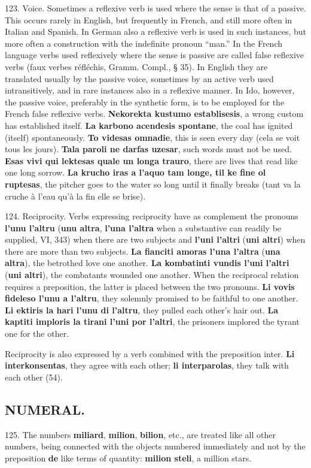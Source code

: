123. Voice. Sometimes a reflexive verb is used where the sense is that of a passive. This occurs rarely in English, but frequently in French, and still more often in Italian and Spanish. In German also a reflexive verb is used in such instances, but more often a construction with the indefinite pronoun ``man.'' In the French language verbs used reflexively where the sense is passive are called false reflexive verbs (faux verbes réfléchis, Gramm. Compl., § 35). In English they are translated usually by the passive voice, sometimes by an active verb used intransitively, and in rare instances also in a reflexive manner. In Ido, however, the passive voice, preferably in the synthetic form, is to be employed for the French false reflexive verbs. \textbf{Nekorekta kustumo establisesis}, a wrong custom has established itself. \textbf{La karbono acendesis spontane}, the coal has ignited (itself) spontaneously. \textbf{To videsas omnadie}, this is seen every day (cela se voit tous les jours). \textbf{Tala paroli ne darfas uzesar}, such words must not be used. \textbf{Esas vivi qui lektesas quale un longa trauro}, there are lives that read like one long sorrow. \textbf{La krucho iras a l'aquo tam longe, til ke fine ol ruptesas}, the pitcher goes to the water so long until it finally breaks (tant va la cruche à l'eau qu'à la fin elle se brise).

124. Reciprocity. Verbs expressing reciprocity have as complement the pronouns \textbf{l'unu l'altru} (\textbf{unu altra}, \textbf{l'una l'altra} when a substantive can readily be supplied, VI, 343) when there are two subjects and \textbf{l'uni l'altri} (\textbf{uni altri}) when there are more than two subjects. \textbf{La fianciti amoras l'una l'altra }(\textbf{una altra}), the betrothed love one another. \textbf{La kombatinti vundis l'uni l'altri }(\textbf{uni altri}), the combatants wounded one another. When the reciprocal relation requires a preposition, the latter is placed between the two pronouns. \textbf{Li vovis fideleso l'unu a l'altru}, they solemnly promised to be faithful to one another. \textbf{Li ektiris la hari l'unu di l'altru}, they pulled each other's hair out. \textbf{La kaptiti imploris la tirani l'uni por l'altri}, the prisoners implored the tyrant one for the other.

Reciprocity is also expressed by a verb combined with the preposition inter. \textbf{Li interkonsentas}, they agree with each other; \textbf{li interparolas}, they talk with each other (54).

\subsection*{NUMERAL.}
125. The numbers \textbf{miliard}, \textbf{milion}, \textbf{bilion}, etc., are treated like all other numbers, being connected with the objects numbered immediately and not by the preposition \textbf{de} like terms of quantity: \textbf{milion steli}, a million stars.

